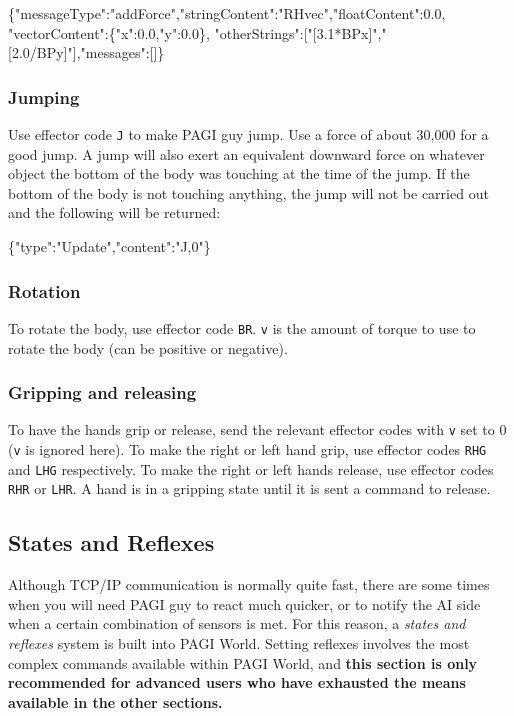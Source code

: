 \begin{center}
\scriptsize{\{"messageType":"addForce","stringContent":"RHvec","floatContent":0.0, "vectorContent":\{"x":0.0,"y":0.0\}, "otherStrings":["[3.1*BPx]","[2.0/BPy]"],"messages":[]\}}
\end{center}

\subsubsection{Jumping}

Use effector code \texttt{J} to make PAGI guy jump. Use a force of about 30,000 for a good jump. A jump will also exert an equivalent downward force on whatever object the bottom of the body was touching at the time of the jump. If the bottom of the body is not touching anything, the jump will not be carried out and the following will be returned:
\begin{center}
\scriptsize{\{"type":"Update","content":"J,0"\}} 
\end{center}

\subsubsection{Rotation}

To rotate the body, use effector code \texttt{BR}. \texttt{v} is the amount of torque to use to rotate the body (can be positive or negative).

\subsubsection{Gripping and releasing}

To have the hands grip or release, send the relevant effector codes with \texttt{v} set to 0 (\texttt{v} is ignored here). To make the right or left hand grip, use effector codes \texttt{RHG} and \texttt{LHG} respectively. To make the right or left hands release, use effector codes \texttt{RHR} or \texttt{LHR}. A hand is in a gripping state until it is sent a command to release.

\subsection{States and Reflexes}
\label{sect:statesAndReflexes}

Although TCP/IP communication is normally quite fast, there are some times when you will need PAGI guy to react much quicker, or to notify the AI side when a certain combination of sensors is met. For this reason, a \textit{states and reflexes} system is built into PAGI World. Setting reflexes involves the most complex commands available within PAGI World, and \textbf{this section is only recommended for advanced users who have exhausted the means available in the other sections.}

